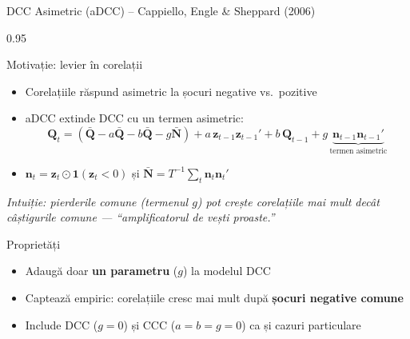 \documentclass[9pt, aspectratio=169, t]{beamer}
\begin{document}
\begin{frame}{DCC Asimetric (aDCC) -- Cappiello, Engle \& Sheppard (2006)}
    \begin{cminipage}{0.95\textwidth}
    {\footnotesize
    \begin{block}{Motivație: levier în corelații}
        \begin{itemize}\setlength{\itemsep}{0pt}
            \item Corelațiile răspund asimetric la șocuri negative vs.\ pozitive
            \item aDCC extinde DCC cu un termen asimetric:
            \[
                \mathbf{Q}_t = (\bar{\mathbf{Q}} - a\bar{\mathbf{Q}} - b\bar{\mathbf{Q}} - g\bar{\mathbf{N}}) + a\,\mathbf{z}_{t-1}\mathbf{z}_{t-1}' + b\,\mathbf{Q}_{t-1} + g\,\underbrace{\mathbf{n}_{t-1}\mathbf{n}_{t-1}'}_{\text{termen asimetric}}
            \]
            \item $\mathbf{n}_t = \mathbf{z}_t \odot \mathbf{1}(\mathbf{z}_t < 0)$ și $\bar{\mathbf{N}} = T^{-1}\sum_t \mathbf{n}_t\mathbf{n}_t'$
        \end{itemize}
        \textit{Intuiție: pierderile comune (termenul $g$) pot crește corelațiile mai mult decât câștigurile comune --- ``amplificatorul de vești proaste.''}
    \end{block}
    \begin{block}{Proprietăți}
        \begin{itemize}\setlength{\itemsep}{0pt}
            \item Adaugă doar \textbf{un parametru} ($g$) la modelul DCC
            \item Captează empiric: corelațiile cresc mai mult după \textbf{șocuri negative comune}
            \item Include DCC ($g=0$) și CCC ($a=b=g=0$) ca și cazuri particulare
        \end{itemize}
    \end{block}
    }
    \end{cminipage}
\end{frame}
\end{document}
